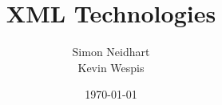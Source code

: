 \titlehead{Hochschule Luzern \\
	Technik \& Architektur}
\subject{Zusammenfassung}
\title{XML Technologies}
\subtitle{}
\author{Simon Neidhart \\ Kevin Wespis \\}
\date{\today}

\maketitle

